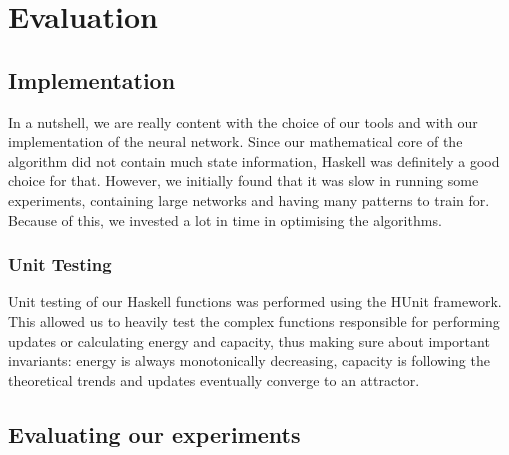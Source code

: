 \chapter{Evaluation}




\section{Implementation}


In a nutshell, we are really content with the choice of our tools and with our implementation of the neural network. Since our mathematical core of the algorithm did not contain much state information, Haskell was definitely a good choice for that. However, we initially found that it was slow in running some experiments, containing large networks and having many patterns to train for. Because of this, we invested a lot in time in optimising the algorithms. 

\subsection{Unit Testing}

Unit testing of our Haskell functions was performed using the HUnit framework. This allowed us to heavily test the complex functions responsible for performing updates or calculating energy and capacity, thus making sure about important invariants: energy is always monotonically decreasing, capacity is following the theoretical trends and updates eventually converge to an attractor. 


\section{Evaluating our experiments}


